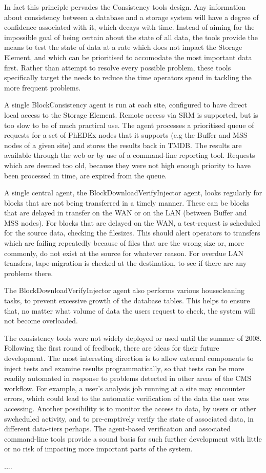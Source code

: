 \documentclass{PoS}
\begin{document}
In fact this principle pervades the Consistency tools design. Any
information about consistency between a database and a storage system
will have a degree of confidence associated with it, which decays with
time. Instead of aiming for the impossible goal of being certain about
the state of all data, the tools provide the means to test the state
of data at a rate which does not impact the Storage Element, and which
can be prioritised to accomodate the most important data first. Rather
than attempt to resolve every possible problem, these tools
specifically target the needs to reduce the time operators spend in
tackling the more frequent problems.

A single BlockConsistency agent is run at each site, configured to
have direct local access to the Storage Element. Remote access via SRM
is supported, but is too slow to be of much practical use. The agent
processes a prioritised queue of requests for a set of PhEDEx nodes
that it supports (e.g the Buffer and MSS nodes of a given site) and
stores the results back in TMDB. The results are available through the
web or by use of a command-line reporting tool. Requests which are
deemed too old, because they were not high enough priority to have
been processed in time, are expired from the queue.

A single central agent, the BlockDownloadVerifyInjector agent, looks
regularly for blocks that are not being transferred in a timely
manner. These can be blocks that are delayed in transfer on the WAN or
on the LAN (between Buffer and MSS nodes). For blocks that are delayed
on the WAN, a test-request is scheduled for the source data, checking
the filesizes. This should alert operators to transfers which are
failing repeatedly because of files that are the wrong size or, more
commonly, do not exist at the source for whatever reason. For overdue
LAN transfers, tape-migration is checked at the destination, to see if
there are any problems there.

The BlockDownloadVerifyInjector agent also performs various
housecleaning tasks, to prevent excessive growth of the database
tables. This helps to ensure that, no matter what volume of data the
users request to check, the system will not become overloaded.

The consistency tools were not widely deployed or used until the
summer of 2008. Following the first round of feedback, there are ideas
for their future development. The most interesting direction is to
allow external components to inject tests and examine results
programmatically, so that tests can be more readily automated in
response to problems detected in other areas of the CMS workflow. For
example, a user's analysis job running at a site may encounter errors,
which could lead to the automatic verification of the data the user
was accessing. Another possibility is to monitor the access to data,
by users or other swcheduled activity, and to pre-emptively verify the
state of associated data, in different data-tiers perhaps. The
agent-based verification and associated command-line tools provide a
sound basis for such further development with little or no risk of
impacting more important parts of the system.

\begin{thebibliography}{99}
....

\end{thebibliography}
\end{document}
